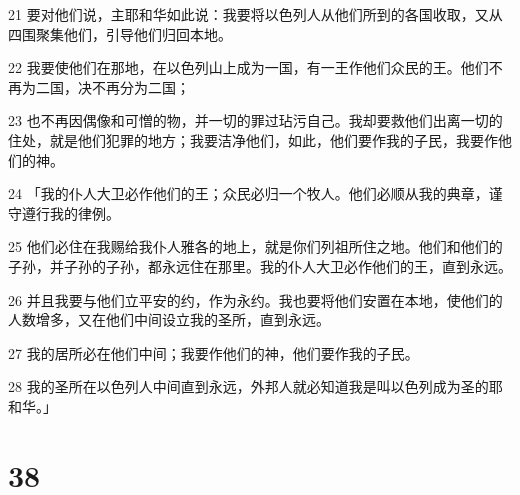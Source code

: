 \par 21 要对他们说，主耶和华如此说：我要将以色列人从他们所到的各国收取，又从四围聚集他们，引导他们归回本地。
\par 22 我要使他们在那地，在以色列山上成为一国，有一王作他们众民的王。他们不再为二国，决不再分为二国；
\par 23 也不再因偶像和可憎的物，并一切的罪过玷污自己。我却要救他们出离一切的住处，就是他们犯罪的地方；我要洁净他们，如此，他们要作我的子民，我要作他们的神。
\par 24 「我的仆人大卫必作他们的王；众民必归一个牧人。他们必顺从我的典章，谨守遵行我的律例。
\par 25 他们必住在我赐给我仆人雅各的地上，就是你们列祖所住之地。他们和他们的子孙，并子孙的子孙，都永远住在那里。我的仆人大卫必作他们的王，直到永远。
\par 26 并且我要与他们立平安的约，作为永约。我也要将他们安置在本地，使他们的人数增多，又在他们中间设立我的圣所，直到永远。
\par 27 我的居所必在他们中间；我要作他们的神，他们要作我的子民。
\par 28 我的圣所在以色列人中间直到永远，外邦人就必知道我是叫以色列成为圣的耶和华。」

\chapter{38}

